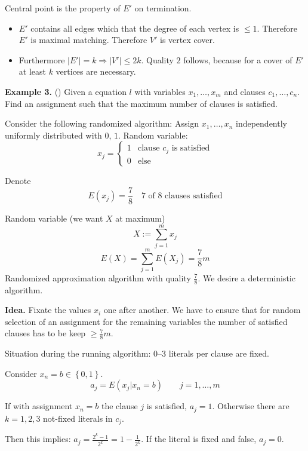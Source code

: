 \documentclass[a4paper]{article}
\newcommand{\probl}[1]{\text{\textsc{#1}}}
\newcommand{\set}[1]{\left\{#1\right\}}
\begin{document}
Central point is the property of $E'$ on termination.
\begin{itemize}
  \item
    $E'$ contains all edges which that the degree of each vertex
    is $\leq 1$. Therefore $E'$ is maximal matching.
    Therefore $V'$ is vertex cover.

  \item
    Furthermore $|E'| = k \Rightarrow |V'| \leq 2k$. Quality $2$ follows,
    because for a cover of $E'$ at least $k$ vertices are necessary.
\end{itemize}


\textbf{Example 3.} (\probl{Max-3-SAT}) Given a \probl{3~SAT} equation $l$ with variables
  $x_1, \ldots, x_m$ and clauses $c_1, \ldots, c_n$. Find an assignment such
  that the maximum number of clauses is satisfied.

Consider the following randomized algorithm:
Assign $x_1, \ldots, x_n$ independently uniformly distributed with $0$, $1$.
Random variable:
\[
  x_j = \begin{cases}
    1 & \text{clause } c_j \text{ is satisfied} \\
    0 & \text{else}
  \end{cases}
\]

Denote
\[
  E(x_j) = \frac78 \quad \text{7 of 8 clauses satisfied}
\]

Random variable (we want $X$ at maximum)
\[
  X := \sum_{j=1}^m x_j
\] \[
  E(X) = \sum_{j=1}^m E(X_j) = \frac78m
\]
Randomized approximation algorithm with quality $\frac78$.
We desire a deterministic algorithm.

\textbf{Idea.} Fixate the values $x_i$ one after another.
  We have to ensure that for random selection of an assignment
  for the remaining variables the number of satisfied clauses
  has to be keep $\geq \frac78m$.

Situation during the running algorithm:
  0--3 literals per clause are fixed.

Consider $x_n = b \in \set{0,1}$.
\[
  a_j = E(x_j | x_n = b) \qquad j = 1,\ldots,m
\]

If with assignment $x_n = b$ the clause $j$ is satisfied, $a_j = 1$.
Otherwise there are $k=1,2,3$ not-fixed literals in $c_j$.

Then this implies: $a_j = \frac{2^k - 1}{2^k} = 1 - \frac{1}{2^k}$.
If the literal is fixed and false, $a_j = 0$.
\end{document}

